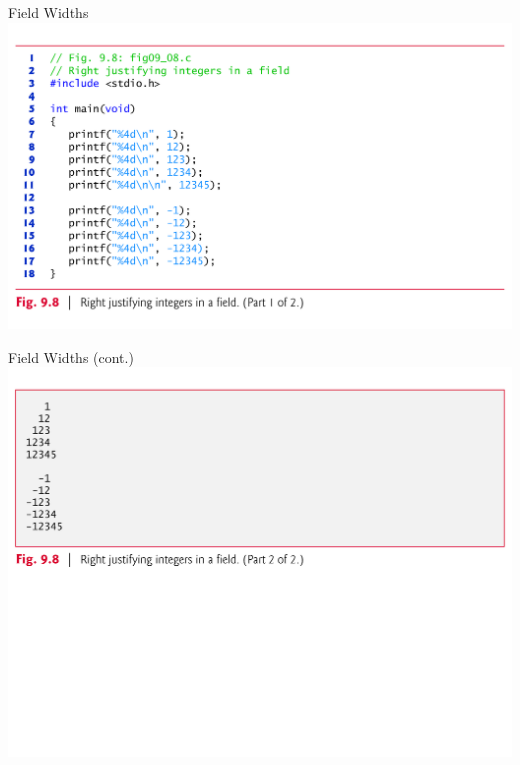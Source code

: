 \documentclass[11pt]{beamer}
\begin{document}
\begin{frame}{Field Widths}
\center
\includegraphics[scale=0.12]{width.png}
\end{frame}

\begin{frame}{Field Widths (cont.)}
\center
\includegraphics[scale=0.35]{width2.png}
\end{frame}
\end{document}

